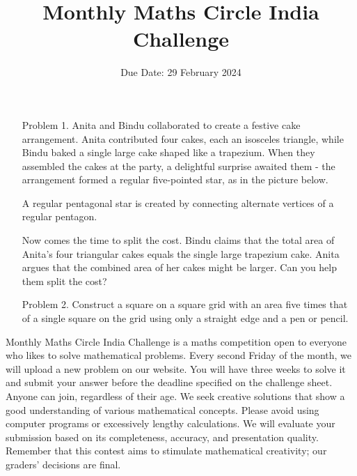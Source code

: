 \documentclass[a4paper,12pt]{article}
\title{Monthly Maths Circle India Challenge}
\date{Due Date: 29 February 2024}
\begin{document}
\maketitle
\thispagestyle{empty}
\begin{enumerate}
    \item[Problem 1.] Anita and Bindu collaborated to create a festive cake arrangement. Anita contributed four cakes, each an isosceles triangle, while Bindu baked a single large cake shaped like a trapezium. When they assembled the cakes at the party, a delightful surprise awaited them - the arrangement formed a regular five-pointed star, as in the picture below.
    \begin{figure}[h]
        \centering
                        
    \end{figure}

    A regular pentagonal star is created by connecting alternate vertices of a regular pentagon.

    Now comes the time to split the cost. Bindu claims that the total area of Anita's four triangular cakes equals the single large trapezium cake. Anita argues that the combined area of her cakes might be larger. Can you help them split the cost?

    
    \item[Problem 2.] Construct a square on a square grid with an area five times that of a single square on the grid using only a straight edge and a pen or pencil.
    \begin{figure}[h]
        \centering
        
    \end{figure}
\end{enumerate}
\newpage
\thispagestyle{empty}
\centering
\begin{minipage}{0.8\textwidth}
    \vspace{3cm}
    Monthly Maths Circle India Challenge is a maths competition open to everyone who likes to solve mathematical problems. Every second Friday of the month, we will upload a new problem on our website. You will have three weeks to solve it and submit your answer before the deadline specified on the challenge sheet. Anyone can join, regardless of their age. We seek creative solutions that show a good understanding of various mathematical concepts. Please avoid using computer programs or excessively lengthy calculations. We will evaluate your submission based on its completeness, accuracy, and presentation quality. Remember that this contest aims to stimulate mathematical creativity; our graders' decisions are final.
\end{minipage}
\end{document}
